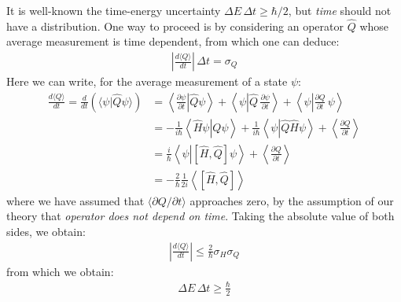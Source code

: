 \documentclass[11pt]{book}
\theoremstyle{break}
\theoremstyle{break}
\newcommand{\pd}{\partial}
\begin{document}
It is well-known the time-energy uncertainty $\Delta E\, \Delta t \geq \hbar/2$, but \textit{time} should not have a distribution. One way to proceed is by considering an operator $\hat{Q}$  whose average measurement is time dependent, from which one can deduce:
\begin{align*}
 \left| \frac{d\langle Q\rangle}{dt}\right|\,\Delta t = \sigma_Q
\end{align*}
Here we can write, for the average measurement of a state $\psi$:
\begin{align*}
\frac{d\langle Q\rangle}{dt} = \frac{d}{dt}\left( \langle \psi |\hat{Q}\psi \rangle\right) &= \left.\left\langle \frac{\pd \psi}{\pd t}\right| \hat{Q}\psi \right\rangle + \left\langle \psi \left| \hat{Q} \, \frac{\pd \psi}{\pd t}\right\rangle\right. + \left\langle \psi \left| \frac{\pd Q}{\pd t}\,\psi \right\rangle\right.\\
&= -\frac{1}{i\hbar}\left\langle\left. \hat{H}\psi\right| Q\psi \right\rangle +\frac{1}{i\hbar}\left\langle \psi \left| \hat{Q}\hat{H}\psi \right.\right\rangle + \left\langle \frac{\pd Q}{\pd t}\right\rangle\\
&= \frac{i}{\hbar}\left\langle \psi\left| [\hat{H},\hat{Q}]\psi \right.\right\rangle+ \left\langle \frac{\pd Q}{\pd t}\right\rangle\\
&= -\frac{2}{\hbar}\frac{1}{2i}\left\langle [\hat{H},\hat{Q}]\right\rangle
\end{align*}
where we have assumed that $\langle\pd Q/\pd t\rangle$ approaches zero, by the assumption of our theory that \textit{operator does not depend on time}. Taking the absolute value of both sides, we obtain:
\begin{align*}
\left| \frac{d\langle Q\rangle}{dt}\right| \leq \frac{2}{\hbar} \sigma_H \sigma_Q
\end{align*}
from which we obtain:
\begin{align*}
\Delta E \, \Delta t \geq \frac{\hbar}{2}
\end{align*}
\end{document}
